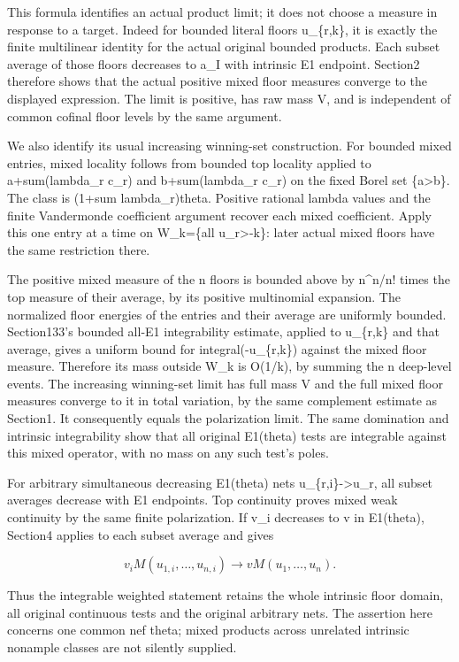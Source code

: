 \documentclass[
]{article}
\begin{document}
This formula identifies an actual product limit; it does not choose a
measure in response to a target. Indeed for bounded literal floors
u\_\{r,k\}, it is exactly the finite multilinear identity for the actual
original bounded products. Each subset average of those floors decreases
to a\_I with intrinsic E1 endpoint. Section2 therefore shows that the
actual positive mixed floor measures converge to the displayed
expression. The limit is positive, has raw mass V, and is independent of
common cofinal floor levels by the same argument.

We also identify its usual increasing winning-set construction. For
bounded mixed entries, mixed locality follows from bounded top locality
applied to a+sum(lambda\_r c\_r) and b+sum(lambda\_r c\_r) on the fixed
Borel set \{a\textgreater b\}. The class is (1+sum lambda\_r)theta.
Positive rational lambda values and the finite Vandermonde coefficient
argument recover each mixed coefficient. Apply this one entry at a time
on W\_k=\{all u\_r\textgreater-k\}: later actual mixed floors have the
same restriction there.

The positive mixed measure of the n floors is bounded above by n\^{}n/n!
times the top measure of their average, by its positive multinomial
expansion. The normalized floor energies of the entries and their
average are uniformly bounded. Section133's bounded all-E1 integrability
estimate, applied to u\_\{r,k\} and that average, gives a uniform bound
for integral(-u\_\{r,k\}) against the mixed floor measure. Therefore its
mass outside W\_k is O(1/k), by summing the n deep-level events. The
increasing winning-set limit has full mass V and the full mixed floor
measures converge to it in total variation, by the same complement
estimate as Section1. It consequently equals the polarization limit. The
same domination and intrinsic integrability show that all original
E1(theta) tests are integrable against this mixed operator, with no mass
on any such test's poles.

For arbitrary simultaneous decreasing E1(theta) nets
u\_\{r,i\}-\textgreater u\_r, all subset averages decrease with E1
endpoints. Top continuity proves mixed weak continuity by the same
finite polarization. If v\_i decreases to v in E1(theta), Section4
applies to each subset average and gives

\[v_i M(u_{1,i},\ldots,u_{n,i})
\longrightarrow vM(u_1,\ldots,u_n).\]

Thus the integrable weighted statement retains the whole intrinsic floor
domain, all original continuous tests and the original arbitrary nets.
The assertion here concerns one common nef theta; mixed products across
unrelated intrinsic nonample classes are not silently supplied.
\end{document}

